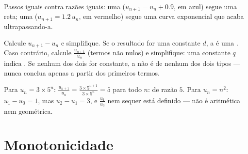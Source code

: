\begin{omfigure}

{\small Passos iguais contra razões iguais: uma 
($u_{n+1} = u_n + 0.9$, em azul) segue uma reta; uma  ($u_{n+1} = 1.2\,u_n$, em vermelho) segue uma curva
exponencial que acaba ultrapassando-a.}
\end{omfigure}

\begin{method}\label{met:g11:seq:recognize}
Calcule $u_{n+1} - u_n$ e simplifique. Se o resultado for uma constante
$d$, a  é uma . Caso contrário, calcule
$\frac{u_{n+1}}{u_n}$ (termos não nulos) e simplifique: uma constante $q$
indica . Se nenhum dos dois for constante, a
 não é de nenhum dos dois tipos --- nunca conclua apenas a
partir dos primeiros termos.
\end{method}

\begin{example}
Para $u_n = 3 \times 5^n$:
$\frac{u_{n+1}}{u_n} = \frac{3 \times 5^{n+1}}{3 \times 5^n} = 5$ para
todo $n$:  de razão $5$. Para $u_n = n^2$:
$u_1 - u_0 = 1$, mas $u_2 - u_1 = 3$, e $\frac{u_1}{u_0}$ nem sequer está
definido --- não é aritmética nem geométrica.
\end{example}

\section{Monotonicidade}

